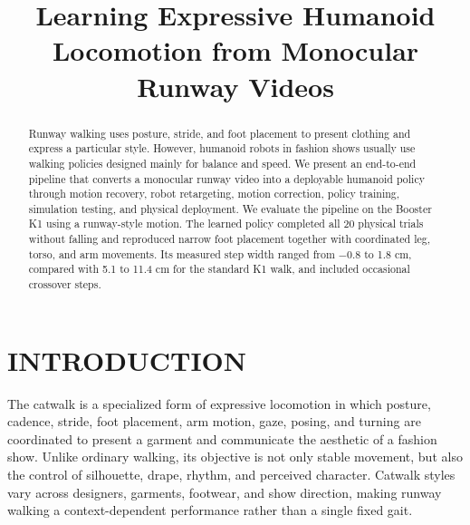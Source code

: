\documentclass[letterpaper, 10 pt, conference]{ieeeconf}  %
\title{\LARGE \bf
Learning Expressive Humanoid Locomotion from Monocular Runway Videos
}
\author{}
\begin{document}
\maketitle
\thispagestyle{empty}
\pagestyle{empty}


\begin{abstract}

Runway walking uses posture, stride, and foot placement to present clothing and express a particular style. However, humanoid robots in fashion shows usually use walking policies designed mainly for balance and speed. We present an end-to-end pipeline that converts a monocular runway video into a deployable humanoid policy through motion recovery, robot retargeting, motion correction, policy training, simulation testing, and physical deployment. We evaluate the pipeline on the Booster K1 using a runway-style motion. The learned policy completed all 20 physical trials without falling and reproduced narrow foot placement together with coordinated leg, torso, and arm movements. Its measured step width ranged from $-0.8$ to 1.8 cm, compared with 5.1 to 11.4 cm for the standard K1 walk, and included occasional crossover steps.


\end{abstract}


\section{INTRODUCTION}


The catwalk is a specialized form of expressive locomotion in which posture, cadence, stride, foot placement, arm motion, gaze, posing, and turning are coordinated to present a garment and communicate the aesthetic of a fashion show. Unlike ordinary walking, its objective is not only stable movement, but also the control of silhouette, drape, rhythm, and perceived character. Catwalk styles vary across designers, garments, footwear, and show direction, making runway walking a context-dependent performance rather than a single fixed gait.
\end{document}

